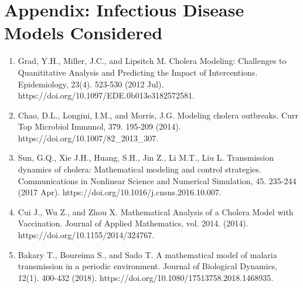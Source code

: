 \documentclass[letter,12pt, usenames,dvipsnames]{article}
\newcommand{\underscore}{\_}
\begin{document}
\clearpage

\section{Appendix: Infectious Disease Models Considered}
\label{sec:Appendix}

\begin{enumerate}
\item Grad, Y.H., Miller, J.C., and Lipsitch M. Cholera Modeling: Challenges to Quanititative Analysis and Predicting the Impact of Intercentions. Epidemiology, 23(4). 523-530 (2012 Jul). https://doi.org/10.1097/EDE.0b013e3182572581. \\
\item Chao, D.L., Longini, I.M., and Morris, J.G. Modeling cholera outbreaks. Curr Top Microbiol Immunol, 379. 195-209 (2014). https://doi.org/10.1007/82\underscore2013\underscore307. \\
\item Sun, G.Q., Xie J.H., Huang, S.H., Jin Z., Li M.T., Liu L. Transmission dynamics of cholera: Mathematical modeling and control strategies. Communications in Nonlinear Science and Numerical Simulation, 45. 235-244 (2017 Apr). https://doi.org/10.1016/j.cnsns.2016.10.007. \\
\item Cui J., Wu Z., and Zhou X. Mathematical Analysis of a Cholera Model with Vaccination. Journal of Applied Mathematics, vol. 2014. (2014). https://doi.org/10.1155/2014/324767. \\
\item Bakary T., Boureima S., and Sado T. A mathematical model of malaria transmission in a periodic environment. Journal of Biological Dynamics, 12(1). 400-432 (2018). https://doi.org/10.1080/17513758.2018.1468935. \\
\end{enumerate}
\end{document}
